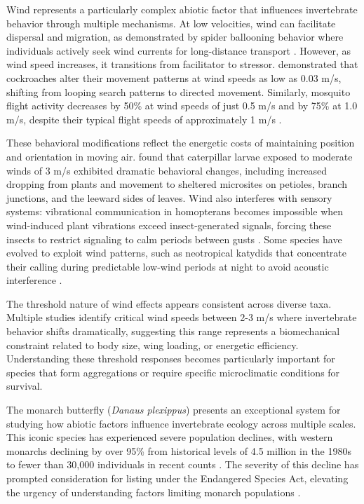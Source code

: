 Wind represents a particularly complex abiotic factor that influences invertebrate behavior through multiple mechanisms. At low velocities, wind can facilitate dispersal and migration, as demonstrated by spider ballooning behavior where individuals actively seek wind currents for long-distance transport \citep{bonteHeritabilitySpiderBallooning2007}. However, as wind speed increases, it transitions from facilitator to stressor. \citet{bellSearchAnemotacticOrientation1979} demonstrated that cockroaches alter their movement patterns at wind speeds as low as 0.03 m/s, shifting from looping search patterns to directed movement. Similarly, mosquito flight activity decreases by 50\% at wind speeds of just 0.5 m/s and by 75\% at 1.0 m/s, despite their typical flight speeds of approximately 1 m/s \citep{bidlingmayerEffectWindVelocity1995}.

These behavioral modifications reflect the energetic costs of maintaining position and orientation in moving air. \citet{leonardExposureWindAlters2016} found that caterpillar larvae exposed to moderate winds of 3 m/s exhibited dramatic behavioral changes, including increased dropping from plants and movement to sheltered microsites on petioles, branch junctions, and the leeward sides of leaves. Wind also interferes with sensory systems: vibrational communication in homopterans becomes impossible when wind-induced plant vibrations exceed insect-generated signals, forcing these insects to restrict signaling to calm periods between gusts \citep{tishechkinVibrationalBackgroundNoise2013}. Some species have evolved to exploit wind patterns, such as neotropical katydids that concentrate their calling during predictable low-wind periods at night to avoid acoustic interference \citep{velillaGoneWindSignal2020}.

The threshold nature of wind effects appears consistent across diverse taxa. Multiple studies identify critical wind speeds between 2-3 m/s where invertebrate behavior shifts dramatically, suggesting this range represents a biomechanical constraint related to body size, wing loading, or energetic efficiency. Understanding these threshold responses becomes particularly important for species that form aggregations or require specific microclimatic conditions for survival.


The monarch butterfly (\textit{Danaus plexippus}) presents an exceptional system for studying how abiotic factors influence invertebrate ecology across multiple scales. This iconic species has experienced severe population declines, with western monarchs declining by over 95\% from historical levels of 4.5 million in the 1980s to fewer than 30,000 individuals in recent counts \citep{schultzCitizenScienceMonitoring2017a, peltonWesternMonarchPopulation2019}. The severity of this decline has prompted consideration for listing under the Endangered Species Act, elevating the urgency of understanding factors limiting monarch populations \citep{croneWhyAreMonarch2019}.

